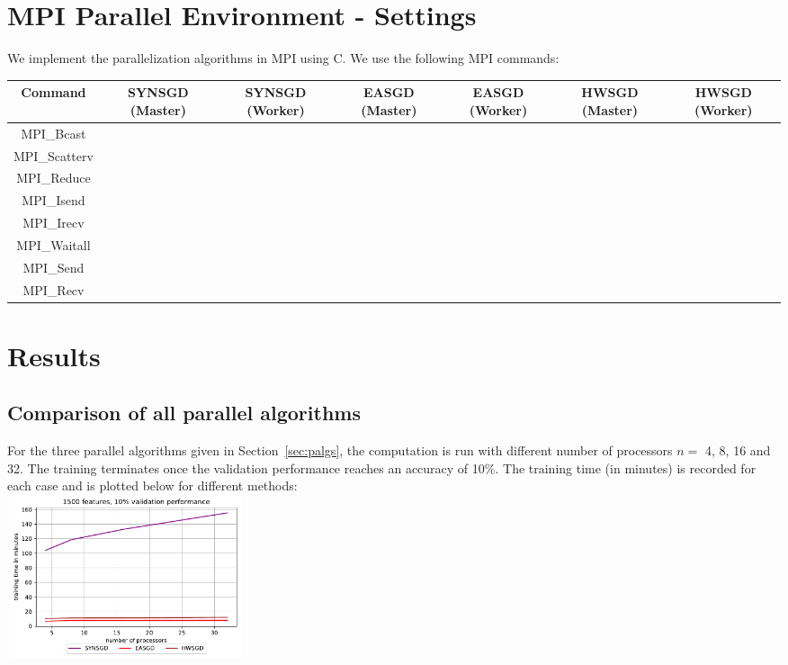 \documentclass[12pt]{article}
\newcommand{\cmark}{\ding{51}}%
\newcommand{\xmark}{\ding{55}}%
\begin{document}
\section{MPI Parallel Environment - Settings}
We implement the parallelization algorithms in MPI using C. We use the following MPI commands:
\begin{table}[ht]
\scriptsize
\centering
\begin{tabular}{ccccccc} 
\toprule
\textbf{Command} & \textbf{SYNSGD} (Master) & \textbf{SYNSGD} (Worker) & \textbf{EASGD} (Master) & \textbf{EASGD} (Worker) & \textbf{HWSGD} (Master) & \textbf{HWSGD} (Worker) \\ \midrule
MPI\_Bcast & \cmark & \cmark & \cmark & \cmark & \cmark & \cmark \\
MPI\_Scatterv & \cmark & \cmark & \xmark & \xmark & \xmark & \xmark \\
MPI\_Reduce  & \cmark & \cmark & \cmark & \cmark & \xmark & \xmark \\
MPI\_Isend & \xmark & \xmark & \xmark & \xmark & \cmark & \xmark \\
MPI\_Irecv & \xmark & \xmark & \xmark & \xmark & \cmark & \xmark \\
MPI\_Waitall & \xmark & \xmark & \xmark & \xmark & \cmark & \xmark \\
MPI\_Send & \xmark & \xmark & \xmark & \xmark & \xmark & \cmark \\
MPI\_Recv & \xmark & \xmark & \xmark & \xmark & \xmark & \cmark \\
\bottomrule
\end{tabular}
\end{table}

\section{Results}
\subsection{Comparison of all parallel algorithms}
For the three parallel algorithms given in Section~\ref{sec:palgs}, the computation is run with different number of processors $n=$ 4, 8, 16 and 32. The training terminates once the validation performance reaches an accuracy of 10\%. The training time (in minutes) is recorded for each case and is plotted below for different methods:\\

{\centering
\includegraphics[width=7cm, height=4.8cm]{images/1500f_10v_def.pdf}\\
}
\end{document}
